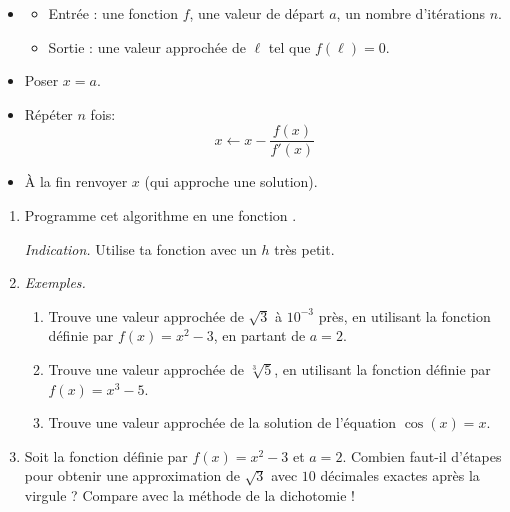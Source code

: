 \documentclass[11pt,class=report,crop=false]{standalone}
\begin{document}
\begin{activite}


\begin{algorithme}
  \sauteligne 
 \begin{itemize}
   \item 
   \begin{itemize} 
       \item Entrée : une fonction $f$, une valeur de départ $a$, un nombre d'itérations $n$.
       \item Sortie : une valeur approchée de $\ell$ tel que $f(\ell)=0$.
     \end{itemize}
    
  \item Poser $x = a$.
  \item Répéter $n$ fois:
 $$x \leftarrow x - \dfrac{f(x)}{f'(x)}$$
    
     
   \item \`A la fin renvoyer $x$ (qui approche une solution).
 \end{itemize}  
 \end{algorithme}

\begin{enumerate}
  \item Programme cet algorithme en une fonction .
  
  \emph{Indication.} Utilise ta fonction  avec un $h$ très petit.
  
  \item \emph{Exemples.} 
  \begin{enumerate}
   \item Trouve une valeur approchée de $\sqrt{3}$ à $10^{-3}$ près, en utilisant la fonction définie par $f(x) = x^2-3$, en partant de $a = 2$.
    \item Trouve une valeur approchée de $\sqrt[3]{5}$, en utilisant la fonction définie par $f(x) = x^3-5$.
    \item Trouve une valeur approchée de la solution de l'équation $\cos(x)=x$.  
  \end{enumerate}
  
  \item Soit la fonction définie par $f(x) = x^2-3$ et $a= 2$. Combien faut-il d'étapes pour obtenir une approximation de $\sqrt{3}$ avec $10$ décimales exactes après la virgule ? Compare avec la méthode de la dichotomie !
   
\end{enumerate} 

\end{activite}
\end{document}
